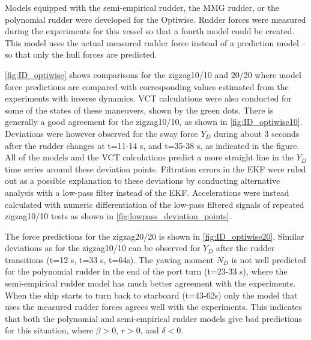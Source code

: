 Models equipped with the semi-empirical rudder, the MMG rudder, or the polynomial rudder were developed for the Optiwise. Rudder forces were measured during the experiments for this vessel so that a fourth model could be created. This model uses the actual measured rudder force instead of a prediction model -- so that only the hull forces are predicted. 

\autoref{fig:ID_optiwise} shows comparisons for the zigzag10/10 and 20/20 where model force predictions are compared with corresponding values estimated from the experiments with inverse dynamics. VCT calculations were also conducted for some of the states of these maneuvers, shown by the green dots.
There is generally a good agreement for the zigzag10/10, as shown in \autoref{fig:ID_optiwise10}. Deviations were however observed for the sway force $Y_D$ during about 3 seconds after the rudder changes at t=11-14 s, and t=35-38 s, as indicated in the figure. All of the models and the VCT calculations predict a more straight line in the $Y_D$ time series around these deviation points. 
Filtration errors in the EKF were ruled out as a possible explanation to these deviations by conducting alternative analysis with a low-pass filter instead of the EKF. Accelerations were instead calculated with numeric differentiation of the low-pass filtered signals of repeated zigzag10/10 tests as shown in \autoref{fig:lowpass_deviation_points}.

The force predictions for the zigzag20/20 is shown in \autoref{fig:ID_optiwise20}. Similar deviations as for the zigzag10/10 can be observed for $Y_D$ after the rudder transitions (t=12 s, t=33 s, t=64s). The yawing moment $N_D$ is not well predicted for the polynomial rudder in the end of the port turn (t=23-33 s), where the semi-empirical rudder model has much better agreement with the experiments. When the ship starts to turn back to starboard (t=43-62s) only the model that uses the measured rudder forces agrees well with the experiments. This indicates that both the polynomial and semi-empirical rudder models give bad predictions for this situation, where $\beta>0$, $r>0$, and $\delta<0$. 

